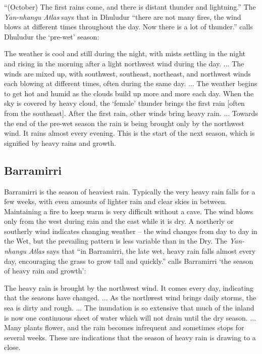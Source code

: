 ``(October) The first rains come, and there is distant thunder and lightning.'' \citep{barber2005}
The \textit{Yan-nhangu Atlas} says that in Dhuludur ``there are not many
fires, the wind blows at different times throughout the day. Now there is
a lot of thunder.''  \citet{davis1989} calls Dhuludur the `pre-wet' season:
\begin{bquote}{\citet{davis1989}}
    The weather is cool and still during the night, with mists settling in the night
    and rising in the morning after a light northwest wind during the day. ...
    The winds are mixed up, with southwest, southeast, northeast, and northwest winds
    each blowing at different times, often during the same day. ...
    The weather begins to get hot and humid as the clouds build up more and more each day.
    When the sky is covered by heavy cloud, the `female' thunder brings
    the first rain [often from the southeast].
    After the first rain, other winds bring heavy rain.
    ...
    Towards the end of the pre-wet season the rain is being brought only by the northwest wind.
    It rains almost every evening.
    This is the start of the next season, which is signified by heavy rains and growth.
\end{bquote}


\subsection{Barramirri}
Barramirri is the season of heaviest rain.  Typically the
very heavy rain falls for a few weeks, with even amounts of lighter rain
and clear skies in between.  Maintaining a fire to keep warm is very
difficult without a cave.  The wind blows only from the west during rain
and the east while it is dry.  A northerly or southerly wind indicates
changing weather -- the wind changes from day to day in the Wet, but the
prevailing pattern is less variable than in the Dry.
%
The \textit{Yan-nhangu Atlas} says that ``in Barramirri, the late wet,
heavy rain falls almost every day, encouraging the grass to grow tall
and quickly.''
%
\citet{davis1989} calls Barramirri `the season of heavy rain and growth':
\begin{bquote}{\citet{davis1989}}
    The heavy rain is brought by the northwest wind. It comes every day,
    indicating that the seasons have changed. ... As the northwest wind
    brings daily storms, the sea is dirty and rough. ... The inundation
    is so extensive that much of the inland is now one continuous sheet
    of water which will not drain until the dry season. ...
    Many plants flower, and the rain becomes infrequent and sometimes
    stops for several weeks.  These are indications that the season of
    heavy rain is drawing to a close.
\end{bquote}


